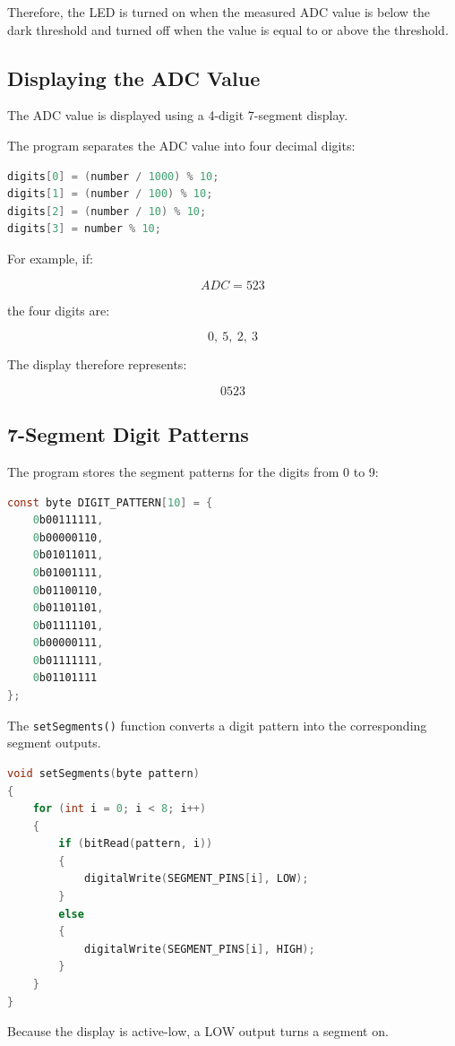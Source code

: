 \documentclass[12pt,a4paper]{article}
\begin{document}
Therefore, the LED is turned on when the measured ADC value is below
the dark threshold and turned off when the value is equal to or above
the threshold.

\subsection{Displaying the ADC Value}

The ADC value is displayed using a 4-digit 7-segment display.

The program separates the ADC value into four decimal digits:

\begin{lstlisting}[language=C]
digits[0] = (number / 1000) % 10;
digits[1] = (number / 100) % 10;
digits[2] = (number / 10) % 10;
digits[3] = number % 10;
\end{lstlisting}

For example, if:

\[
ADC = 523
\]

the four digits are:

\[
0,\ 5,\ 2,\ 3
\]

The display therefore represents:

\[
0523
\]

\subsection{7-Segment Digit Patterns}

The program stores the segment patterns for the digits from 0 to 9:

\begin{lstlisting}[language=C]
const byte DIGIT_PATTERN[10] = {
    0b00111111,
    0b00000110,
    0b01011011,
    0b01001111,
    0b01100110,
    0b01101101,
    0b01111101,
    0b00000111,
    0b01111111,
    0b01101111
};
\end{lstlisting}

The \texttt{setSegments()} function converts a digit pattern into the
corresponding segment outputs.

\begin{lstlisting}[language=C]
void setSegments(byte pattern)
{
    for (int i = 0; i < 8; i++)
    {
        if (bitRead(pattern, i))
        {
            digitalWrite(SEGMENT_PINS[i], LOW);
        }
        else
        {
            digitalWrite(SEGMENT_PINS[i], HIGH);
        }
    }
}
\end{lstlisting}

Because the display is active-low, a LOW output turns a segment on.
\end{document}
